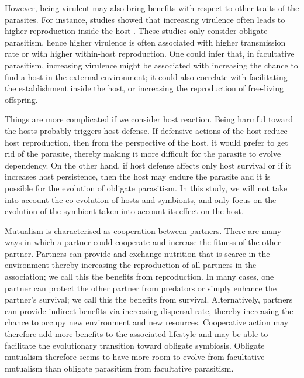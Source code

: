 \documentclass[11.5pt]{article}
\begin{document}
\medskip

However, being virulent may also bring benefits with respect to other traits of the parasites. For instance, studies showed that increasing virulence often leads to higher reproduction inside the host \parencite{DeRoode2008, Longdon2015, Messenger1999, Lipsitch1997, Mackinnon2006}. These studies only consider obligate parasitism, hence higher virulence is often associated with higher transmission rate or with higher within-host reproduction. One could infer that, in facultative parasitism, increasing virulence might be associated with increasing the chance to find a host in the external environment; it could also correlate with facilitating the establishment inside the host, or increasing the reproduction of free-living offspring. 

\medskip

Things are more complicated if we consider host reaction. Being harmful toward the hosts probably triggers host defense. If defensive actions of the host reduce host reproduction, then from the perspective of the host, it would prefer to get rid of the parasite, thereby making it more difficult for the parasite to evolve dependency. On the other hand, if host defense affects only host survival or if it increases host persistence, then the host may endure the parasite and it is possible for the evolution of obligate parasitism. In this study, we will not take into account the co-evolution of hosts and symbionts, and only focus on the evolution of the symbiont taken into account its effect on the host.

\medskip

Mutualism is characterised as cooperation between partners. There are many ways in which a partner could cooperate and increase the fitness of the other partner. Partners can provide and exchange nutrition that is scarce in the environment thereby increasing the reproduction of all partners in the association; we call this the benefits from reproduction. In many cases, one partner can protect the other partner from predators or simply enhance the partner's survival; we call this the benefits from survival. Alternatively, partners can provide indirect benefits via increasing dispersal rate, thereby increasing the chance to occupy new environment and new resources. Cooperative action may therefore add more benefits to the associated lifestyle and may be able to facilitate the evolutionary transition toward obligate symbiosis. Obligate mutualism therefore seems to have more room to evolve from facultative mutualism than obligate parasitism from facultative parasitism. 
\end{document}
